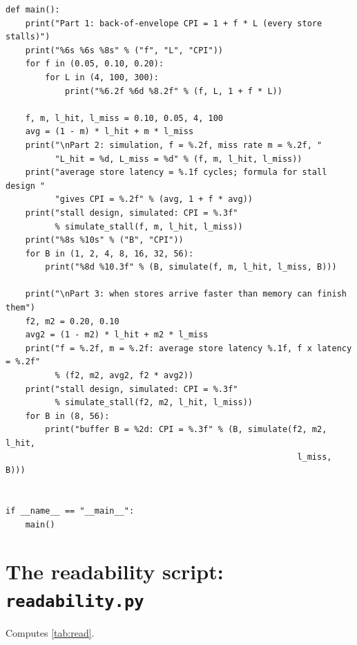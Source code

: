 \begin{lstlisting}[style=vspython]
def main():
    print("Part 1: back-of-envelope CPI = 1 + f * L (every store stalls)")
    print("%6s %6s %8s" % ("f", "L", "CPI"))
    for f in (0.05, 0.10, 0.20):
        for L in (4, 100, 300):
            print("%6.2f %6d %8.2f" % (f, L, 1 + f * L))

    f, m, l_hit, l_miss = 0.10, 0.05, 4, 100
    avg = (1 - m) * l_hit + m * l_miss
    print("\nPart 2: simulation, f = %.2f, miss rate m = %.2f, "
          "L_hit = %d, L_miss = %d" % (f, m, l_hit, l_miss))
    print("average store latency = %.1f cycles; formula for stall design "
          "gives CPI = %.2f" % (avg, 1 + f * avg))
    print("stall design, simulated: CPI = %.3f"
          % simulate_stall(f, m, l_hit, l_miss))
    print("%8s %10s" % ("B", "CPI"))
    for B in (1, 2, 4, 8, 16, 32, 56):
        print("%8d %10.3f" % (B, simulate(f, m, l_hit, l_miss, B)))

    print("\nPart 3: when stores arrive faster than memory can finish them")
    f2, m2 = 0.20, 0.10
    avg2 = (1 - m2) * l_hit + m2 * l_miss
    print("f = %.2f, m = %.2f: average store latency %.1f, f x latency = %.2f"
          % (f2, m2, avg2, f2 * avg2))
    print("stall design, simulated: CPI = %.3f"
          % simulate_stall(f2, m2, l_hit, l_miss))
    for B in (8, 56):
        print("buffer B = %2d: CPI = %.3f" % (B, simulate(f2, m2, l_hit,
                                                           l_miss, B)))


if __name__ == "__main__":
    main()
\end{lstlisting}

\section{The readability script: \texttt{readability.py}}
Computes \cref{tab:read}.

